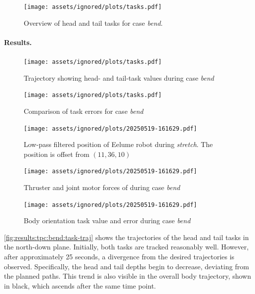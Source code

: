 \begin{figure}[!ht]
    \centering
    \texttt{[image: assets/ignored/plots/tasks.pdf]}
    \caption{Overview of head and tail tasks for case \textit{bend}.}
    \label{fig:eelume:tpc:tasks:bend}
\end{figure}

\paragraph{Results.}

\begin{figure}[!ht]
    \centering
    \texttt{[image: assets/ignored/plots/tasks.pdf]}
    \caption{Trajectory showing head- and tail-task values during case \textit{bend}}
    \label{fig:results:tpc:bend:task-traj}
\end{figure}
\begin{figure}[!ht]
    \centering
    \texttt{[image: assets/ignored/plots/tasks.pdf]}
    \caption{Comparison of task errors for case \textit{bend}}
    \label{fig:results:tpc:bend:task-errors}
\end{figure}

\begin{figure}[!ht]
    \centering
    \texttt{[image: assets/ignored/plots/20250519-161629.pdf]}
    \caption[Low-pass filtered position of Eelume robot during \textit{stretch} case with \gls{tpc}]
    {Low-pass filtered position of Eelume robot during \textit{stretch}. The position is offset from \((11, 36, 10)\)}
    \label{fig:results:tpc:bend:1:pos}
\end{figure}
\begin{figure}[!ht]
    \centering
    \texttt{[image: assets/ignored/plots/20250519-161629.pdf]}
    \caption{Thruster and joint motor forces of during case \textit{bend}}
    \label{fig:results:tpc:bend:1:forces-torques}
\end{figure}

\begin{figure}[!ht]
    \centering
    \texttt{[image: assets/ignored/plots/20250519-161629.pdf]}
    \caption{Body orientation task value and error during case \textit{bend}}
    \label{fig:results:tpc:bend:dp-tracking}
\end{figure}



\autoref{fig:results:tpc:bend:task-traj} shows the trajectories of the head and tail tasks in the north-down plane. Initially, both tasks are tracked reasonably well. However, after approximately 25 seconds, a divergence from the desired trajectories is observed. Specifically, the head and tail depths begin to decrease, deviating from the planned paths. This trend is also visible in the overall body trajectory, shown in black, which ascends after the same time point.

